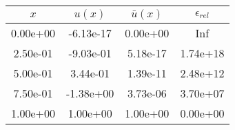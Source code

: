 \begin{tabular}{|c|c|c|c|}
\hline
\textbf{$x$}&\textbf{$u(x)$}&\textbf{$\bar{u}(x)$}&\textbf{$\epsilon_{rel}$}\\\hline
0.00e+00&-6.13e-17&0.00e+00&Inf\\\hline
2.50e-01&-9.03e-01&5.18e-17&1.74e+18\\\hline
5.00e-01&3.44e-01&1.39e-11&2.48e+12\\\hline
7.50e-01&-1.38e+00&3.73e-06&3.70e+07\\\hline
1.00e+00&1.00e+00&1.00e+00&0.00e+00\\\hline
\end{tabular}
